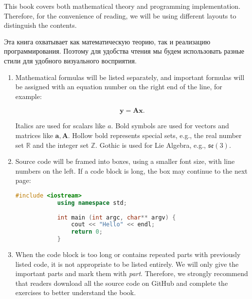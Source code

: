 \begin{English}
    This book covers both mathematical theory and programming implementation. Therefore, for the convenience of reading, we will be using different layouts to distinguish the contents.
\end{English}

\begin{Russian}
    Эта книга охватывает как математическую теорию, так и реализацию программирования. Поэтому для удобства чтения мы будем использовать разные стили для удобного визуального восприятия.
\end{Russian}

\begin{English}
    \begin{enumerate}
    	\item Mathematical formulas will be listed separately, and important formulas will be assigned with an equation number on the right end of the line, for example:
    
    	\begin{equation}
    	   \mathbf{y} =\mathbf{A}\mathbf{x}.
    	\end{equation}
    
    	Italics are used for scalars like $a$. Bold symbols are used for vectors and matrices like $\mathbf{a}, \mathbf{A}$. Hollow bold represents special sets, e.g., the real number set $\mathbb{R}$ and the integer set $\mathbb{Z}$. Gothic is used for Lie Algebra, e.g., $\mathfrak{se}(3)$.
    
    	\item Source code will be framed into boxes, using a smaller font size, with line numbers on the left. If a code block is long, the box may continue to the next page:
    	\begin{lstlisting}[language=C++,caption=Code example:]
        	#include <iostream>
        	using namespace std;
        
        	int main (int argc, char** argv) {
        		cout << "Hello" << endl;
        		return 0;
        	}
    	\end{lstlisting}
    
    	\item When the code block is too long or contains repeated parts with previously listed code, it is not appropriate to be listed entirely. We will only give the important parts and mark them with \textit{part}. Therefore, we strongly recommend that readers download all the source code on GitHub and complete the exercises to better understand the book.
    

\end{enumerate}
\end{English}
